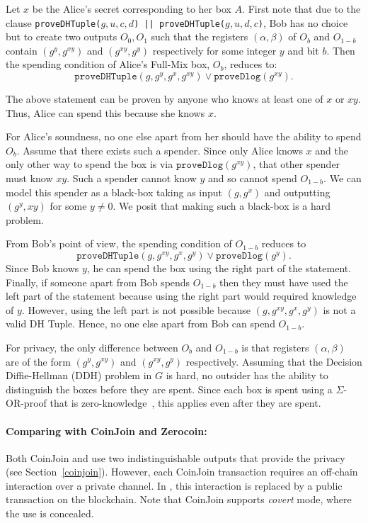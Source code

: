 \documentclass[runningheads]{llncs}
\newcommand{\zerocoin}{Zerocoin\xspace}
\begin{document}
Let $x$ be the Alice's secret corresponding to her box $A$. First note that due to the clause 
\texttt{proveDHTuple($g, u, c, d$) || proveDHTuple($g, u, d, c$)}, Bob has no choice but to create two outputs $O_0, O_1$ such that the registers $(\alpha, \beta)$ of $O_b$ and $O_{1-b}$ contain $(g^y, g^{xy})$ and $(g^{xy}, g^y)$ respectively for some integer $y$ and bit $b$. Then the spending condition of Alice's Full-Mix box, $O_b$, reduces to:
$$\texttt{proveDHTuple}(g, g^{y}, g^x, g^{xy}) \lor \texttt{proveDlog}(g^{xy}).$$ 

The above statement can be proven by anyone who knows at least one of $x$ or $xy$. 
Thus, Alice can spend this because she knows $x$. 

For Alice's soundness, no one else apart from her should have the ability to spend $O_b$. Assume that there exists such a spender. Since only Alice knows $x$ and the only other way to spend the box is via $\texttt{proveDlog}(g^{xy})$, that other spender must know $xy$. Such a spender cannot know $y$ and so cannot spend $O_{1-b}$. We can model this spender as a black-box taking as input $(g, g^x)$ and outputting $(g^y, xy)$ for some $y\neq 0$. We posit that making such a black-box is a hard problem.

From Bob's point of view, the spending condition of $O_{1-b}$ reduces to 
$$\texttt{proveDHTuple}(g, g^{xy}, g^x, g^{y}) \lor \texttt{proveDlog}(g^{y}).$$
Since Bob knows $y$, he can spend the box using the right part of the statement. Finally, if someone apart from Bob spends $O_{1-b}$ then they must have used the left part of the statement because using the right part would required knowledge of $y$. However, using the left part is not possible because $(g, g^{xy}, g^x, g^{y})$ is not a valid DH Tuple. Hence, no one else apart from Bob can spend $O_{1-b}$.

For privacy, the only difference between $O_b$ and $O_{1-b}$ is that registers $(\alpha,\beta)$ are of the form $(g^y, g^{xy})$ and $(g^{xy}, g^y)$ respectively. Assuming that the Decision Diffie-Hellman (DDH) problem in $G$ is hard, no outsider has the ability to distinguish the boxes before they are spent. Since each box is spent using a $\Sigma$-OR-proof that is zero-knowledge~\cite{Dam10}, this applies even after they are spent. 

\paragraph{Comparing with CoinJoin and \zerocoin:} Both CoinJoin and \algname use two indistinguishable outputs that provide the privacy (see Section~\ref{coinjoin}). However, each CoinJoin transaction requires an off-chain interaction over a private channel. In \algname, this interaction is replaced by a public transaction on the blockchain. Note that CoinJoin supports {\em covert} mode, where the use is concealed.
\end{document}
